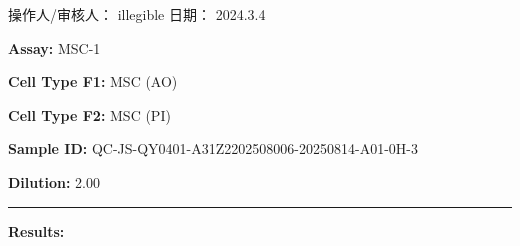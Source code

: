 \documentclass[UTF8,10pt,a4paper,fontset=fandol]{ctexart}
\newcommand{\fieldvalue}[1]{#1}
\newcommand{\handwritten}[1]{#1}
\begin{document}
\vfill

\noindent
操作人/审核人：
\fieldvalue{\handwritten{illegible}}
\hfill
日期：
\fieldvalue{\handwritten{2024.3.4}}

\newpage

\noindent
\textbf{Assay:}
\fieldvalue{MSC-1}

\vspace{0.6em}

\noindent
\textbf{Cell Type F1:}
\fieldvalue{MSC (AO)}

\noindent
\textbf{Cell Type F2:}
\fieldvalue{MSC (PI)}

\vspace{0.6em}

\noindent
\textbf{Sample ID:}
\fieldvalue{QC-JS-QY0401-A31Z2202508006-20250814-A01-0H-3}

\noindent
\textbf{Dilution:}
\fieldvalue{2.00}

\vspace{0.8em}
\noindent\rule{\linewidth}{0.4pt}

\noindent\textbf{Results:}

\vspace{0.4em}
\end{document}
